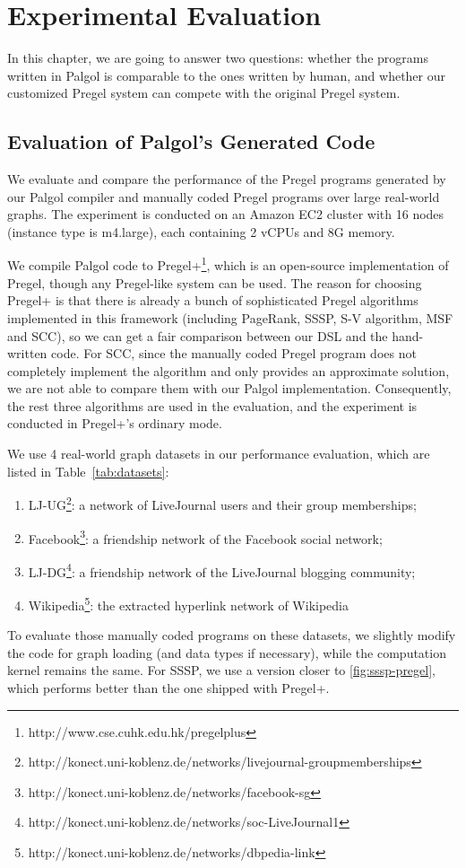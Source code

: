 \documentclass{sokendai_thesis} %
\begin{document}
\chapter{Experimental Evaluation}
\label{sec:evaluation}

In this chapter, we are going to answer two questions: whether the programs written in Palgol is comparable to the ones written by human, and whether our customized Pregel system can compete with the original Pregel system.

\section{Evaluation of Palgol's Generated Code}

We evaluate and compare the performance of the Pregel programs generated by our Palgol compiler and manually coded Pregel programs over large real-world graphs.
The experiment is conducted on an Amazon EC2 cluster with 16 nodes (instance type is m4.large), each containing 2 vCPUs and 8G memory.

We compile Palgol code to Pregel+\footnote{http://www.cse.cuhk.edu.hk/pregelplus}, which is an open-source implementation of Pregel, though any Pregel-like system can be used.
The reason for choosing Pregel+ is that there is already a bunch of sophisticated Pregel algorithms implemented in this framework (including PageRank, SSSP, S-V algorithm, MSF and SCC), so we can get a fair comparison between our DSL and the hand-written code.
For SCC, since the manually coded Pregel program does not completely implement the algorithm and only provides an approximate solution, we are not able to compare them with our Palgol implementation.
Consequently, the rest three algorithms are used in the evaluation, and the experiment is conducted in Pregel+'s ordinary mode.

We use 4 real-world graph datasets in our performance evaluation, which are listed in Table~\ref{tab:datasets}:
\begin{enumerate}
\item LJ-UG\footnote{http://konect.uni-koblenz.de/networks/livejournal-groupmemberships}: a network of LiveJournal users and their group memberships;
\item Facebook\footnote{http://konect.uni-koblenz.de/networks/facebook-sg}: a friendship network of the Facebook social network;
\item LJ-DG\footnote{http://konect.uni-koblenz.de/networks/soc-LiveJournal1}: a friendship network of the LiveJournal blogging community;
\item Wikipedia\footnote{http://konect.uni-koblenz.de/networks/dbpedia-link}: the extracted hyperlink network of Wikipedia
\end{enumerate}
To evaluate those manually coded programs on these datasets, we slightly modify the code for graph loading (and data types if necessary), while the computation kernel remains the same.
For SSSP, we use a version closer to \autoref{fig:sssp-pregel}, which performs better than the one shipped with Pregel+.
\end{document}
